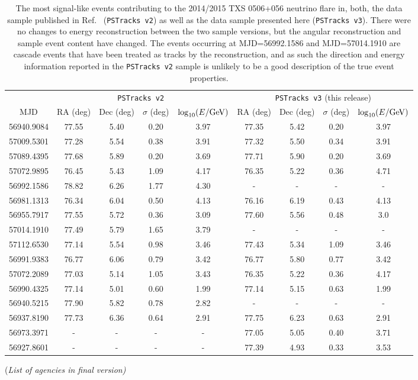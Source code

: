 \documentclass[aps,10pt,prd,twocolumn,floats,letterpaper,showpacs,nofootinbib,bibnotes,notitlepage,superscriptaddress,floatfix]{revtex4-1}
\newcommand{\MA}[1]{{\color{magenta}#1}}
\begin{document}
\begin{table}[p]
\centering
\begin{ruledtabular}
\begin{tabular}{c|cccc|cccc}
\multicolumn{1}{c|}{} &
\multicolumn{4}{c|}{\MA{\tt PSTracks v2}~\cite{IceCube:2018cha,IceCube:2019}} & 
\multicolumn{4}{c}{\MA{\tt PSTracks v3} (this release)}\\[0.1cm]
MJD & RA (deg) & Dec (deg) & $\sigma$ (deg) & $\log_{10}(E/{\rm GeV})$ & RA (deg) & Dec (deg) & $\sigma$ (deg) & $\log_{10}(E/{\rm GeV})$\\ 
\hline
56940.9084 & 77.55 & 5.40 & 0.20 & 3.97 & 77.35 & 5.42 & 0.20 & 3.97\\
57009.5301 & 77.28 & 5.54 & 0.38 & 3.91 & 77.32 & 5.50 & 0.34 & 3.91\\
57089.4395 & 77.68 & 5.89 & 0.20 & 3.69 & 77.71 & 5.90 & 0.20 & 3.69\\
57072.9895 & 76.45 & 5.43 & 1.09 & 4.17 & 76.35 & 5.22 & 0.36 & 4.71\\
56992.1586 & 78.82 & 6.26 & 1.77 & 4.30 & - & - & - & - \\
56981.1313& 76.34 & 6.04 & 0.50 & 4.13 & 76.16 & 6.19 & 0.43 & 4.13 \\
56955.7917 & 77.55 & 5.72 & 0.36 & 3.09 & 77.60 & 5.56 & 0.48 & 3.0 \\
57014.1910 & 77.49 & 5.79 & 1.65 & 3.79 & - & - & - & -  \\
57112.6530 & 77.14 & 5.54 & 0.98 & 3.46 & 77.43 & 5.34 & 1.09 & 3.46 \\
56991.9383 & 76.77 & 6.06 & 0.79 & 3.42 & 76.77 & 5.80 & 0.77 & 3.42 \\
57072.2089 & 77.03 & 5.14 & 1.05 & 3.43 & 76.35 & 5.22 & 0.36 & 4.17 \\
56990.4325 & 77.14 & 5.01 & 0.60 & 1.99 & 77.14 & 5.15 & 0.63 & 1.99 \\
56940.5215 & 77.90 & 5.82 & 0.78 & 2.82 & - & - & - & - \\
56937.8190 & 77.73 & 6.36 & 0.64 & 2.91 & 77.75 & 6.23 & 0.63 & 2.91 \\
56973.3971 & - & - & - & - & 77.05 & 5.05 & 0.40 & 3.71 \\
56927.8601 & - & - & - & - & 77.39 & 4.93 & 0.33 & 3.53 \\
\end{tabular}
\end{ruledtabular}
\caption[]{The most signal-like events contributing to the 2014/2015 TXS 0506+056 neutrino flare in, both, the data sample published in Ref.~\cite{IceCube:2019} ({\tt PSTracks v2}) as well as the data sample presented here ({\tt PSTracks v3}). There were no changes to energy reconstruction between the two sample versions, but the angular reconstruction and sample event content have changed. The events occurring at MJD=56992.1586 and MJD=57014.1910 are cascade events that have been treated as tracks by the reconstruction, and as such the direction and energy information reported in the {\tt PSTracks v2} sample is unlikely to be a good description of the true event properties.}\label{tab:TXSFlareEvtsTable}
\end{table}

\begin{acknowledgements}
\begin{center}\MA{(\it List of agencies in final version)}\end{center}
%
\end{acknowledgements}




\end{document}
